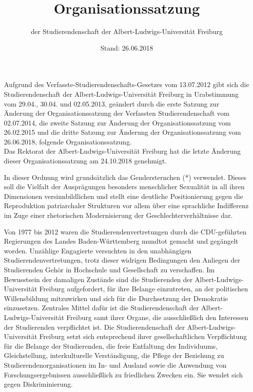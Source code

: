 \documentclass[fontsize=12pt,parskip=half]{scrartcl}
\begin{document}
\subject{Lesefassung}
\title{Organisationssatzung}
\subtitle{der Studierendenschaft der Albert-Ludwigs-Universität Freiburg}
\date{Stand: 26.06.2018}
\maketitle

\pagebreak

\tableofcontents

\vspace*{\fill}

Aufgrund des Verfasste-Studierendenschafts-Gesetzes vom 13.07.2012 gibt sich die
Studierendenschaft der Albert-Ludwigs-Universität Freiburg in Urabstimmung vom
29.04., 30.04. und 02.05.2013, geändert durch die erste Satzung zur Änderung der
Organisationssatzung der Verfassten Studierendenschaft vom 02.07.2014, die
zweite Satzung zur Änderung der Organisationssatzung vom 26.02.2015 und die
dritte Satzung zur Änderung der Organisationssatzung vom 26.06.2018, folgende
Organisationssatzung.\\
Das Rektorat der Albert-Ludwigs-Universität Freiburg hat die letzte Änderung
dieser Organisationssatzung am 24.10.2018 genehmigt.

In dieser Ordnung wird grundsätzlich das Gendersternchen (*) verwendet. Dieses
soll die Vielfalt der Ausprägungen besonders menschlicher Sexualität in all
ihren Dimensionen versinnbildlichen und stellt eine deutliche Positionierung
gegen die Reproduktion patriarchaler Strukturen vor allem über eine sprachliche
Indifferenz im Zuge einer rhetorischen Modernisierung der
Geschlechterverhältnisse dar.

\pagebreak


Von 1977 bis 2012 waren die Studierendenvertretungen durch die CDU-geführten
Regierungen des Landes Baden-Württemberg mundtot gemacht und gegängelt worden.
Unzählige Engagierte versuchten in den unabhängigen Studierendenvertretungen,
trotz dieser widrigen Bedingungen den Anliegen der Studierenden Gehör in
Hochschule und Gesellschaft zu verschaffen. Im Bewusstsein der damaligen
Zustände sind die Studierenden der Albert-Ludwigs-Universität Freiburg
aufgefordert, für ihre Belange einzutreten, an der politischen Willensbildung
mitzuwirken und sich für die Durchsetzung der Demokratie einzusetzen. Zentrales
Mittel dafür ist die Studierendenschaft der Albert-Ludwigs-Universität Freiburg
samt ihrer Organe, die ausschließlich den Interessen der Studierenden
verpflichtet ist.
Die Studierendenschaft der Albert-Ludwigs-Universität Freiburg setzt sich
entsprechend ihrer gesellschaftlichen Verpflichtung für die Belange der
Studierenden, die freie Entfaltung des Individuums, Gleichstellung,
interkulturelle Verständigung, die Pflege der Beziehung zu
Studierendenorganisationen im In- und Ausland sowie die Anwendung von
Forschungsergebnissen ausschließlich zu friedlichen Zwecken ein. Sie wendet sich
gegen Diskriminierung.
\end{document}
